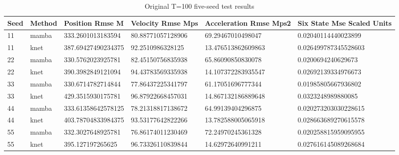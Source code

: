 \begin{table}[t]
\centering
\caption{Original T=100 five-seed test results}
\label{tab:t100}
\scriptsize
\begin{tabular}{llllll}
\hline
Seed & Method & Position Rmse M & Velocity Rmse Mps & Acceleration Rmse Mps2 & Six State Mse Scaled Units \\
\hline
11 & mamba & 333.2601013183594 & 80.88771057128906 & 69.29467010498047 & 0.02040114440023899 \\
11 & knet & 387.69427490234375 & 92.2510986328125 & 13.476513862609863 & 0.026499787345528603 \\
22 & mamba & 330.5762023925781 & 82.45150756835938 & 65.86090850830078 & 0.0200694240629673 \\
22 & knet & 390.3982849121094 & 94.43783569335938 & 14.107372283935547 & 0.02692139334976673 \\
33 & mamba & 330.6714782714844 & 77.86437225341797 & 61.17051696777344 & 0.01985805667936802 \\
33 & knet & 429.3515930175781 & 96.87922668457031 & 14.867132186889648 & 0.0323248989880085 \\
44 & mamba & 333.61358642578125 & 78.21318817138672 & 64.99139404296875 & 0.020273203030228615 \\
44 & knet & 403.78704833984375 & 93.53177642822266 & 13.782588005065918 & 0.028663689270615578 \\
55 & mamba & 332.3027648925781 & 76.86174011230469 & 72.24970245361328 & 0.020258815959095955 \\
55 & knet & 395.127197265625 & 96.73326110839844 & 14.62972640991211 & 0.027616145089268684 \\
\hline
\end{tabular}
\end{table}
